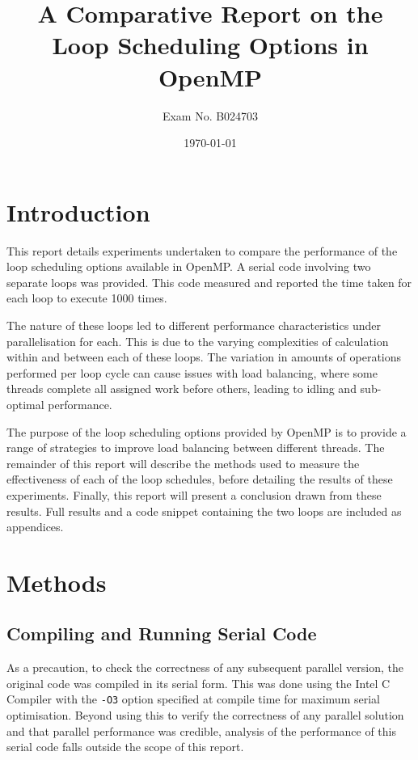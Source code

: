 \documentclass[a4paper,12pt]{article}
\begin{document}
\title{A Comparative Report on the Loop Scheduling Options in OpenMP}
\author{Exam No. B024703}
\date{\today}
\maketitle

\section{Introduction}

This report details experiments undertaken to compare the performance of the loop scheduling options available in OpenMP. A serial code involving two separate loops was provided. This code measured and reported the time taken for each loop to execute 1000 times. 

The nature of these loops led to different performance characteristics under parallelisation for each. This is due to the varying complexities of calculation within and between each of these loops. The variation in amounts of operations performed per loop cycle can cause issues with load balancing, where some threads complete all assigned work before others, leading to idling and sub-optimal performance.

The purpose of the loop scheduling options provided by OpenMP is to provide a range of strategies to improve load balancing between different threads. The remainder of this report will describe the methods used to measure the effectiveness of each of the loop schedules, before detailing the results of these experiments. Finally, this report will present a conclusion drawn from these results. Full results and a code snippet containing the two loops are included as appendices.

\section{Methods}
\subsection{Compiling and Running Serial Code}
As a precaution, to check the correctness of any subsequent parallel version, the original code was compiled in its serial form. This was done using the Intel C Compiler with the \verb|-O3| option specified at compile time for maximum serial optimisation. Beyond using this to verify the correctness of any parallel solution and that parallel performance was credible, analysis of the performance of this serial code falls outside the scope of this report.
\end{document}
